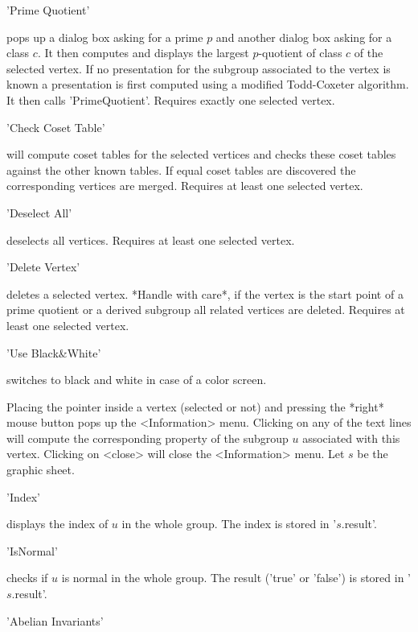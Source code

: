 'Prime Quotient'

pops up a dialog box asking for a prime $p$ and another dialog box asking
for a class $c$.  It then  computes and displays the largest $p$-quotient
of class $c$ of the selected vertex.  If no presentation for the subgroup
associated to the vertex is known a  presentation is first computed using
a   modified  Todd-Coxeter algorithm.   It    then calls 'PrimeQuotient'.
Requires exactly one selected vertex.


'Check Coset Table'

will compute  coset tables  for the selected   vertices and  checks these
coset  tables against the other known  tables.  If equal coset tables are
discovered the corresponding vertices are  merged.  Requires at least one
selected vertex.

'Deselect All'

deselects all vertices.  Requires at least one selected vertex.

'Delete Vertex'

deletes  a selected vertex.   *Handle with  care*, if  the vertex is  the
start  point  of  a  prime quotient  or   a derived subgroup all  related
vertices are deleted.  Requires at least one selected vertex.

'Use Black\&White'

switches to black and white in case of a color screen.


Placing the pointer  inside a vertex (selected  or not) and  pressing the
*right* mouse button pops up the <Information>  menu.  Clicking on any of
the text  lines will compute the corresponding   property of the subgroup
$u$  associated  with this  vertex. Clicking  on <close>  will  close the
<Information> menu.  Let $s$ be the graphic sheet.

'Index'

displays  the index of  $u$ in the whole  group.  The  index is stored in
'$s$.result'.

'IsNormal'

checks  if $u$ is  normal  in the  whole group.    The result  ('true' or
'false') is stored in '$s$.result'.

'Abelian Invariants'

